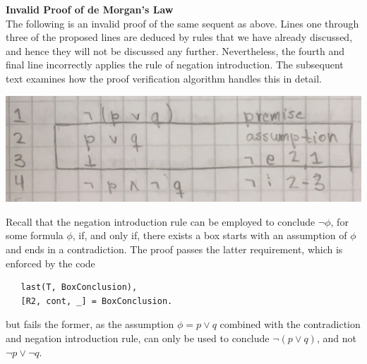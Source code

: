 \documentclass[a4paper, 11pt]{article}
\begin{document}
   \textbf{Invalid Proof of de Morgan's Law} \\
   The following is an invalid proof of the same sequent as
   above. Lines one through three of the proposed lines are 
   deduced by rules that we have already discussed, and hence 
   they will not be discussed any further. Nevertheless, the
   fourth and final line incorrectly applies the rule of
   negation introduction. The subsequent text examines how the
   proof verification algorithm handles this in detail.   

   \includegraphics[scale=0.25]{de-morgan-invalid}
   
   Recall that the negation introduction rule can be employed
   to conclude $\neg \phi$, for some formula $\phi$, if, and 
   only if, there exists a box starts with an assumption of
   $\phi$ and ends in a contradiction. The proof passes the
   latter requirement, which is enforced by the code

\begin{verbatim}
   last(T, BoxConclusion),
   [R2, cont, _] = BoxConclusion.
\end{verbatim}

   but fails the former, as the assumption $\phi = p \vee q$
   combined with the contradiction and negation introduction 
   rule, can only be used to conclude $\neg (p \vee q)$, and
   not $\neg p \vee \neg q$.
\end{document}
